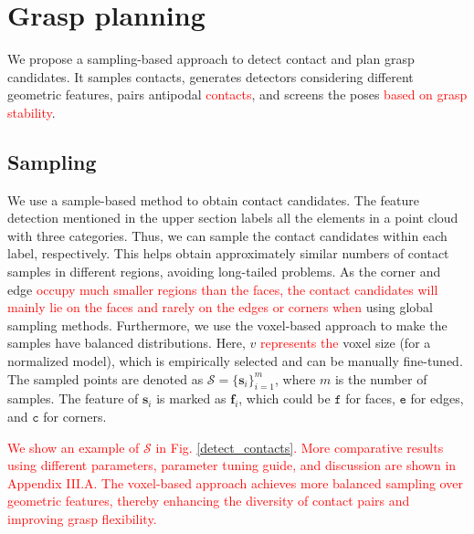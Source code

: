 \documentclass[journal]{IEEEtran}
\newcommand{\rev}[1]{\textcolor{red}{#1}}
\begin{document}


\section{Grasp planning}
We propose a sampling-based approach to detect contact and plan grasp candidates. It samples contacts, generates detectors considering different geometric features, pairs antipodal \rev{contacts}, and screens the poses \rev{based on grasp stability}.

\subsection{Sampling}
We use a sample-based method to obtain contact candidates. The feature detection mentioned in the upper section labels all the elements in a point cloud with three categories.
Thus, we can sample the contact candidates within each label, respectively. This helps obtain approximately similar numbers of contact samples in different regions, avoiding long-tailed problems. 
As the corner and edge \rev{occupy much smaller regions than the faces, the contact candidates will mainly lie on the faces and rarely on the edges or corners when} using global sampling methods.
Furthermore, we use the voxel-based approach to make the samples have balanced distributions. Here, $v$ \rev{represents the} voxel size (for a normalized model), which is empirically selected and can be manually fine-tuned.
The sampled points are denoted as \( \mathcal{S} = \{\mathbf{s}_i\}_{i=1}^m \), where \( m \) is the number of samples. The feature of $\mathbf{s}_i$ is marked as $\mathbf{f}_i$, which could be $\mathtt{f}$ for faces, $\mathtt{e}$ for edges, and $\mathtt{c}$ for corners. 

\rev{We show an example of $\mathcal{S}$ in Fig. \ref{detect_contacts}. More comparative results using different parameters, parameter tuning guide, and discussion are shown in Appendix III.A. The voxel-based approach achieves more balanced sampling over geometric features, thereby enhancing the diversity of contact pairs and improving grasp flexibility.}
\end{document}
